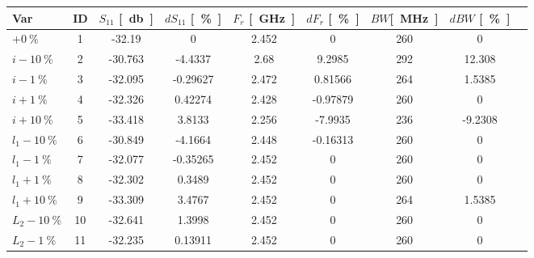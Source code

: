 \documentclass[Deriaz_Traiber_Labo02]{subfiles}
\begin{document}
\begin{table}[H]
\centering
\begin{tabular}{|l|c|cc|cc|cc|c|}\hline
	Var 		   	& ID  &  $S_{11}$ \si{[\decibel]} &  $dS_{11}$ \si{[\percent]}   &  $F_r$ \si{[\giga\hertz]} &   $dF_r$ \si{[\percent]}  & $BW$\si{[\mega\hertz]} &   $dBW$ \si{[\percent]}  \\ \hline\hline
    $  +    \SI{ 0}{\percent}  $ &   1  &   -32.19  &        0   &  2.452  &          0  &   260  &          0\\\hline                                               
    $ i -   \SI{10}{\percent}  $ &   2  &  -30.763  &   -4.4337  &   2.68  &     9.2985  &   292  &     12.308\\                                                         
    $ i -   \SI{ 1}{\percent}  $ &   3  &  -32.095  &  -0.29627  &  2.472  &    0.81566  &   264  &     1.5385\\                                                         
    $ i +   \SI{ 1}{\percent}  $ &   4  &  -32.326  &   0.42274  &  2.428  &   -0.97879  &   260  &          0\\                                                         
    $ i +   \SI{10}{\percent}  $ &   5  &  -33.418  &    3.8133  &  2.256  &    -7.9935  &   236  &    -9.2308\\\hline                                                         
    $ l_1 - \SI{10}{\percent}  $ &   6  &  -30.849  &   -4.1664  &  2.448  &   -0.16313  &   260  &          0\\                                                         
    $ l_1 - \SI{ 1}{\percent}  $ &   7  &  -32.077  &  -0.35265  &  2.452  &          0  &   260  &          0\\                                                         
    $ l_1 + \SI{ 1}{\percent}  $ &   8  &  -32.302  &    0.3489  &  2.452  &          0  &   260  &          0\\                                                         
    $ l_1 + \SI{10}{\percent}  $ &   9  &  -33.309  &    3.4767  &  2.452  &          0  &   264  &     1.5385\\\hline                                                         
    $ L_2 - \SI{10}{\percent}  $ &  10  &  -32.641  &    1.3998  &  2.452  &          0  &   260  &          0\\                                                         
    $ L_2 - \SI{ 1}{\percent}  $ &  11  &  -32.235  &   0.13911  &  2.452  &          0  &   260  &          0\\                                                         

\end{tabular}
\end{table}
\end{document}
